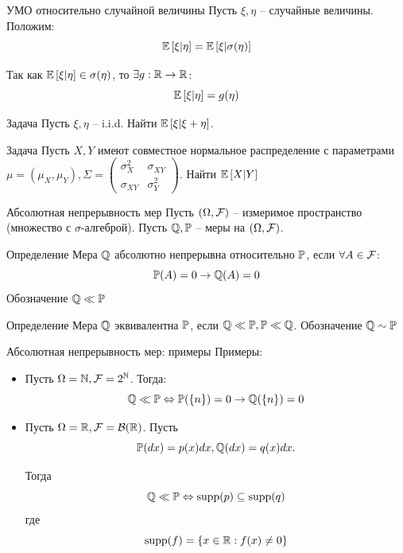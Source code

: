 \documentclass{beamer}
\begin{document}
\begin{frame}{УМО относительно случайной величины}
    Пусть $\xi, \eta$ -- случайные величины. Положим:
    $$
        \mathbb{E}\left[\xi | \eta\right] = \mathbb{E}\left[ \xi | \sigma(\eta) \right]
    $$

    Так как $\mathbb{E}\left[\xi | \eta\right] \in \sigma(\eta)$, то $\exists g:\mathbb{R}\to\mathbb{R}$: 
    $$
    \mathbb{E}\left[\xi | \eta\right] = g(\eta)
    $$

    \begin{block}{Задача}
        Пусть $\xi, \eta$ -- i.i.d. Найти $\mathbb{E} \left[ \xi | \xi + \eta\right]$.
    \end{block}

    \begin{block}{Задача}
        Пусть $X, Y$ имеют совместное нормальное распределение с параметрами $\mu = (\mu_X, \mu_Y), \Sigma = \begin{pmatrix}
            \sigma_X^2 & \sigma_{XY} \\
            \sigma_{XY} & \sigma_Y^2
        \end{pmatrix}$. Найти $\mathbb{E} \left[ X | Y\right]$
    \end{block}
\end{frame}
\begin{frame}{Абсолютная непрерывность мер}
    Пусть $(\Omega, \mathcal{F})$ -- измеримое пространство (множество с $\sigma$-алгеброй). Пусть $\mathbb{Q}, \mathbb{P}$ -- меры на $(\Omega, \mathcal{F})$.

    \begin{block}{Определение}
        Мера $\mathbb{Q}$ абсолютно непрерывна относительно $\mathbb{P}$, если $\forall A \in \mathcal{F}$:
        $$
            \mathbb{P}(A) = 0 \to \mathbb{Q}(A) = 0
        $$Обозначение $\mathbb{Q} \ll \mathbb{P}$
    \end{block}

    \begin{block}{Определение}
        Мера $\mathbb{Q}$ эквивалентна $\mathbb{P}$, если $\mathbb{Q} \ll \mathbb{P}, \mathbb{P} \ll \mathbb{Q}$. Обозначение $\mathbb{Q} \sim \mathbb{P}$
    \end{block}
\end{frame}

\begin{frame}{Абсолютная непрерывность мер: примеры}
    Примеры:
    \begin{itemize}
        \item     Пусть $\Omega = \mathbb{N}, \mathcal{F}=2^{\mathbb{N}}$. Тогда:
    $$
        \mathbb{Q} \ll \mathbb{P} \Leftrightarrow \mathbb{P}(\{n\}) = 0 \to \mathbb{Q}(\{n\}) = 0
    $$

\item     Пусть $\Omega=\mathbb{R}, \mathcal{F} = \mathcal{B}(\mathbb{R})$. Пусть $$\mathbb{P}(dx) = p(x)dx, \mathbb{Q}(dx) = q(x) dx.$$

Тогда 
    $$
        \mathbb{Q} \ll \mathbb{P} \Leftrightarrow \mathrm{supp}(p) \subseteq\mathrm{supp}(q)
    $$
    где 
    $$
        \mathrm{supp}(f) = \{x \in \mathbb{R} : f(x) \neq 0 \}
    $$
    \end{itemize}
\end{frame}
\end{document}
